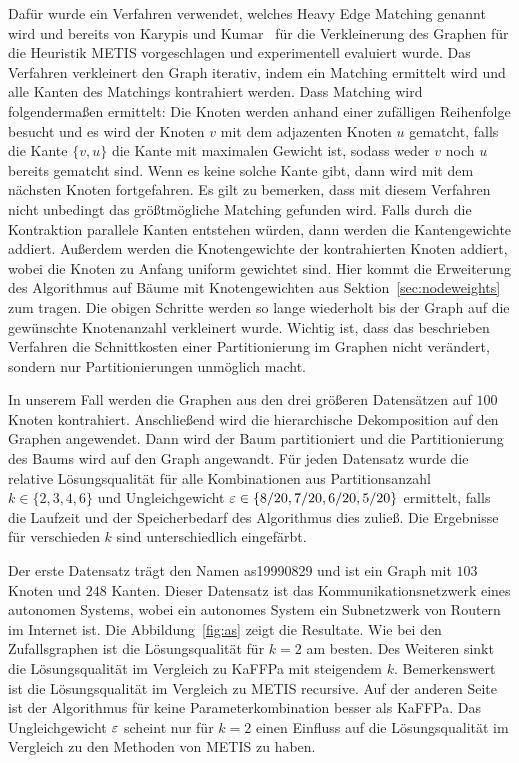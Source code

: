 Dafür wurde ein Verfahren verwendet, welches Heavy Edge Matching genannt wird und bereits von Karypis und Kumar~\cite{KK98} für die Verkleinerung des Graphen für die Heuristik METIS vorgeschlagen und experimentell evaluiert wurde.
Das Verfahren verkleinert den Graph iterativ, indem ein Matching ermittelt wird und alle Kanten des Matchings kontrahiert werden.
Dass Matching wird folgendermaßen ermittelt:
Die Knoten werden anhand einer zufälligen Reihenfolge besucht und es wird der Knoten $v$ mit dem adjazenten Knoten $u$ gematcht, falls die Kante $\{v, u\}$ die Kante mit maximalen Gewicht ist, sodass weder $v$ noch $u$ bereits gematcht sind.
Wenn es keine solche Kante gibt, dann wird mit dem nächsten Knoten fortgefahren.
Es gilt zu bemerken, dass mit diesem Verfahren nicht unbedingt das größtmögliche Matching gefunden wird.
Falls durch die Kontraktion parallele Kanten entstehen würden, dann werden die Kantengewichte addiert.
Außerdem werden die Knotengewichte der kontrahierten Knoten addiert, wobei die Knoten zu Anfang uniform gewichtet sind.
Hier kommt die Erweiterung des Algorithmus auf Bäume mit Knotengewichten aus Sektion~\ref{sec:nodeweights} zum tragen.
Die obigen Schritte werden so lange wiederholt bis der Graph auf die gewünschte Knotenanzahl verkleinert wurde.
Wichtig ist, dass das beschrieben Verfahren die Schnittkosten einer Partitionierung im Graphen nicht verändert, sondern nur Partitionierungen unmöglich macht.

In unserem Fall werden die Graphen aus den drei größeren Datensätzen auf $100$ Knoten kontrahiert.
Anschließend wird die hierarchische Dekomposition auf den Graphen angewendet.
Dann wird der Baum partitioniert und die Partitionierung des Baums wird auf den Graph angewandt.
Für jeden Datensatz wurde die relative Lösungsqualität für alle Kombinationen aus Partitionsanzahl $k \in \{2,3,4,6\}$ und Ungleichgewicht $\varepsilon \in \{8/20, 7/20, 6/20, 5/20\}$ ermittelt, falls die Laufzeit und der Speicherbedarf des Algorithmus dies zuließ.
Die Ergebnisse für verschieden $k$ sind unterschiedlich eingefärbt.

Der erste Datensatz trägt den Namen as19990829 und ist ein Graph mit $103$ Knoten und $248$ Kanten.
Dieser Datensatz ist das Kommunikationsnetzwerk eines autonomen Systems, wobei ein autonomes System ein Subnetzwerk von Routern im Internet ist.
Die Abbildung~\ref{fig:as} zeigt die Resultate.
Wie bei den Zufallsgraphen ist die Lösungsqualität für $k=2$ am besten.
Des Weiteren sinkt die Lösungsqualität im Vergleich zu KaFFPa mit steigendem $k$.
Bemerkenswert ist die Lösungsqualität im Vergleich zu METIS recursive.
Auf der anderen Seite ist der Algorithmus für keine Parameterkombination besser als KaFFPa.
Das Ungleichgewicht $\varepsilon$ scheint nur für $k=2$ einen Einfluss auf die Lösungsqualität im Vergleich zu den Methoden von METIS zu haben.

